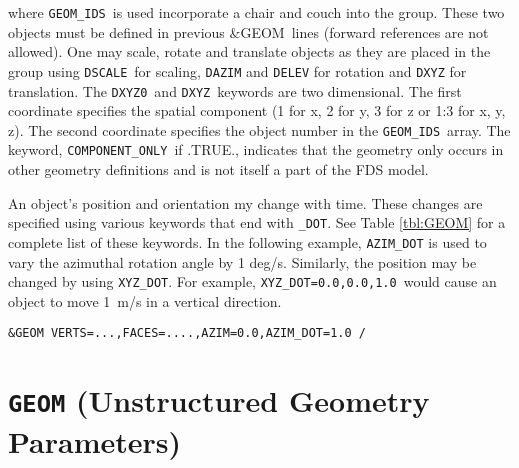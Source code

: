 \documentclass[12pt]{article}
\begin{document}
\noindent where {\tt GEOM\_IDS}\ is used incorporate a chair and couch into the group.  These two objects must be defined in previous {\&GEOM}\ lines (forward references are not allowed).   One may scale, rotate and translate objects as they are placed in the group using {\tt DSCALE}\, for scaling, {\tt DAZIM} and {\tt DELEV} for rotation and {\tt DXYZ} for translation. The {\tt DXYZ0}\ and {\tt DXYZ}\ keywords are two dimensional.  The first coordinate specifies the spatial component (1 for x, 2 for y, 3 for z or 1:3 for x, y, z).  The second coordinate specifies the object number in the {\tt GEOM\_IDS}\ array. The keyword, {\tt COMPONENT\_ONLY}\, if .TRUE., indicates that the geometry only occurs in other geometry definitions and is not itself a part of the FDS model.

An object's position and orientation my change with time.  These changes are specified using various keywords that end with {\tt \_DOT}.  See Table \ref{tbl:GEOM} for a complete list of these keywords. In the following example, {\tt AZIM\_DOT} is used to vary the azimuthal rotation angle by 1 deg/s.  Similarly, the position may be changed by using {\tt XYZ\_DOT}.  For example, {\tt XYZ\_DOT=0.0,0.0,1.0}\ would cause an object to move 1~m/s in a vertical direction.
\begin{verbatim}
&GEOM VERTS=...,FACES=....,AZIM=0.0,AZIM_DOT=1.0 /
\end{verbatim}

\vspace{\baselineskip}


\section{\texorpdfstring{{\tt GEOM}}{GEOM} (Unstructured Geometry Parameters)}
\end{document}
